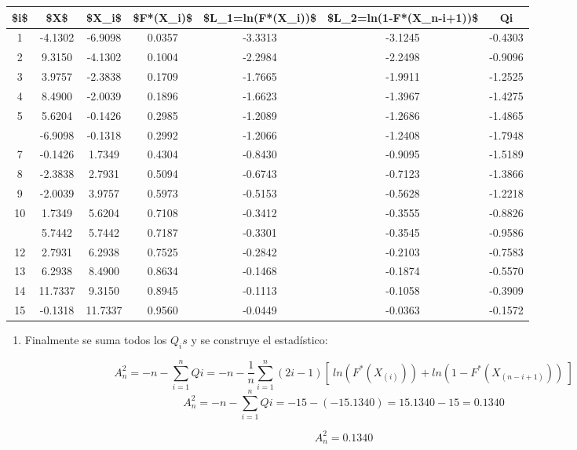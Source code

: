 \documentclass[
  a4paper,
  oneside,
  openany]{book}
\providecommand{\tightlist}{%
  \setlength{\itemsep}{0pt}\setlength{\parskip}{0pt}}
\begin{document}
\begin{table}[H]
\centering
\begin{tabular}{ccccccc}
\toprule
\$i\$ & \$X\$ & \$X\_i\$ & \$F*(X\_i)\$ & \$L\_1=ln(F*(X\_i))\$ & \$L\_2=ln(1-F*(X\_n-i+1))\$ & Qi\\
\midrule
1 & -4.1302 & -6.9098 & 0.0357 & -3.3313 & -3.1245 & -0.4303\\
2 & 9.3150 & -4.1302 & 0.1004 & -2.2984 & -2.2498 & -0.9096\\
3 & 3.9757 & -2.3838 & 0.1709 & -1.7665 & -1.9911 & -1.2525\\
4 & 8.4900 & -2.0039 & 0.1896 & -1.6623 & -1.3967 & -1.4275\\
5 & 5.6204 & -0.1426 & 0.2985 & -1.2089 & -1.2686 & -1.4865\\
\addlinespace
6 & -6.9098 & -0.1318 & 0.2992 & -1.2066 & -1.2408 & -1.7948\\
7 & -0.1426 & 1.7349 & 0.4304 & -0.8430 & -0.9095 & -1.5189\\
8 & -2.3838 & 2.7931 & 0.5094 & -0.6743 & -0.7123 & -1.3866\\
9 & -2.0039 & 3.9757 & 0.5973 & -0.5153 & -0.5628 & -1.2218\\
10 & 1.7349 & 5.6204 & 0.7108 & -0.3412 & -0.3555 & -0.8826\\
\addlinespace
11 & 5.7442 & 5.7442 & 0.7187 & -0.3301 & -0.3545 & -0.9586\\
12 & 2.7931 & 6.2938 & 0.7525 & -0.2842 & -0.2103 & -0.7583\\
13 & 6.2938 & 8.4900 & 0.8634 & -0.1468 & -0.1874 & -0.5570\\
14 & 11.7337 & 9.3150 & 0.8945 & -0.1113 & -0.1058 & -0.3909\\
15 & -0.1318 & 11.7337 & 0.9560 & -0.0449 & -0.0363 & -0.1572\\
\bottomrule
\end{tabular}
\end{table}

\begin{enumerate}
\def\labelenumi{\arabic{enumi})}
\setcounter{enumi}{6}
\tightlist
\item
  Finalmente se suma todos los \(Q_{i}s\) y se construye el estadístico:
\end{enumerate}

\[A_n^2=-n-\sum_{i=1}^{n}Qi=-n-\frac{1}{n}\sum_{i=1}^{n}\left(2i-1\right)[ \ ln(F^*(X_{(i)})) +ln(1-F^*(X_{(n-i+1)})) \ ]\]
\[A_n^2=-n-\sum_{i=1}^{n}Qi=-15-(-15.1340)=15.1340-15=0.1340\]

\[A_n^2=0.1340\]
\end{document}
